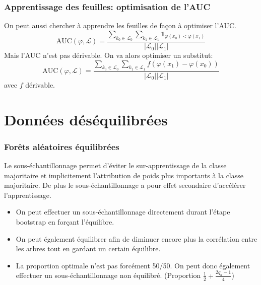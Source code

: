 \documentclass[dvipsnames,10pt]{beamer}
\theoremstyle{plain}
\theoremstyle{definition}
\begin{document}
\begin{frame}
\frametitle{Apprentissage des feuilles: optimisation de l'AUC}
On peut aussi chercher à apprendre les feuilles de façon à optimiser l'AUC.
\begin{equation*}
    \mathrm{AUC} ( \varphi , \mathcal{L} ) = \frac{\sum_{k_0 \in \mathcal{L_0}} \sum_{k_1 \in \mathcal{L_1}} \mathds{1}_{\varphi(x_0) < \varphi(x_1)} }{\vert \mathcal{L}_0 \vert \vert \mathcal{L}_1 \vert }
\end{equation*}
Mais l'AUC n'est pas dérivable. On va alors optimiser un substitut:
\begin{equation*}
    \mathrm{AUC} ( \varphi , \mathcal{L} ) = \frac{\sum_{k_0 \in \mathcal{L_0}} \sum_{k_1 \in \mathcal{L_1}} f \left( \varphi(x_1) - \varphi(x_0) \right) }{\vert \mathcal{L}_0 \vert \vert \mathcal{L}_1 \vert }
\end{equation*}
avec $f$ dérivable.
\end{frame}


\section{Données déséquilibrées}

\begin{frame}
\frametitle{Forêts aléatoires équilibrées}
Le sous-échantillonnage permet d'éviter le sur-apprentissage de la classe majoritaire et implicitement l'attribution de poids plus importants à la classe majoritaire. De plus le sous-échantillonnage a pour effet secondaire d'accélérer l'apprentissage.
\begin{itemize}
    \item On peut effectuer un sous-échantillonnage directement durant l'étape bootstrap en forçant l'équilibre.
    \item On peut également équilibrer  afin de diminuer encore plus la corrélation entre les arbres tout en gardant un certain équilibre.
    \item La proportion optimale n'est pas forcément 50/50. On peut donc également effectuer un sous-échantillonnage non équilibré. (Proportion $\frac{1}{2} + \frac{2 q_a - 1}{4}$)
\end{itemize}
\end{frame}
\end{document}
